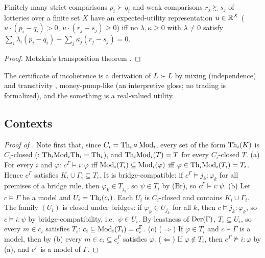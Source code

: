 \begin{proposition}\label{prop:existence:vnm}
Finitely many strict comparisons $p_i\succ q_i$ and weak comparisons $r_j\succsim s_j$ of lotteries over a finite set $X$ have an expected-utility representation $u\in\mathbb{R}^X$ ($u\cdot(p_i-q_i)>0$, $u\cdot(r_j-s_j)\ge0$) iff no $\lambda,\kappa\ge0$ with $\lambda\neq0$ satisfy $\sum_i\lambda_i(p_i-q_i)+\sum_j\kappa_j(r_j-s_j)=0$.
\end{proposition}

\begin{proof}
Motzkin's transposition theorem \citep{motzkin1936beitrage}.
\end{proof}

The certificate of incoherence is a derivation of $L\succ L$ by mixing (independence) and transitivity \citep{vonneumann1944theory}, money-pump-like (an interpretive gloss; no trading is formalized), and the something is a real-valued utility.

\subsection{Contexts}\label{app:existence:contexts}

\begin{proof}[Proof of ]
Note first that, since $C_i=\mathrm{Th}_i\circ\mathrm{Mod}_i$, every set of the form $\mathrm{Th}_i(K)$ is $C_i$-closed (: $\mathrm{Th}_i\mathrm{Mod}_i\mathrm{Th}_i=\mathrm{Th}_i$), and $\mathrm{Th}_i\mathrm{Mod}_i(T)=T$ for every $C_i$-closed $T$.
(a) For every $i$ and $\varphi$: $c^\Gamma\models i{:}\varphi$ iff $\mathrm{Mod}_i(T_i)\subseteq\mathrm{Mod}_i(\varphi)$ iff $\varphi\in\mathrm{Th}_i\mathrm{Mod}_i(T_i)=T_i$. Hence $c^\Gamma$ satisfies $K_i\cup\Gamma_i\subseteq T_i$. It is bridge-compatible: if $c^\Gamma\models j_k{:}\varphi_k$ for all premises of a bridge rule, then $\varphi_k\in T_{j_k}$, so $\psi\in T_i$ by (Br), so $c^\Gamma\models i{:}\psi$.
(b) Let $c\models\Gamma$ be a model and $U_i=\mathrm{Th}_i(c_i)$. Each $U_i$ is $C_i$-closed and contains $K_i\cup\Gamma_i$. The family $(U_i)$ is closed under bridges: if $\varphi_k\in U_{j_k}$ for all $k$, then $c\models j_k{:}\varphi_k$, so $c\models i{:}\psi$ by bridge-compatibility, i.e.\ $\psi\in U_i$. By leastness of $\mathrm{Der}(\Gamma)$, $T_i\subseteq U_i$, so every $m\in c_i$ satisfies $T_i$: $c_i\subseteq\mathrm{Mod}_i(T_i)=c^\Gamma_i$.
(c) ($\Rightarrow$) If $\varphi\in T_i$ and $c\models\Gamma$ is a model, then by (b) every $m\in c_i\subseteq c^\Gamma_i$ satisfies $\varphi$. ($\Leftarrow$) If $\varphi\notin T_i$, then $c^\Gamma\not\models i{:}\varphi$ by (a), and $c^\Gamma$ is a model of $\Gamma$.
\end{proof}

